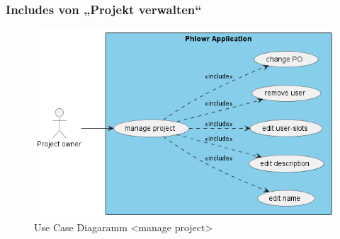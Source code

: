 \subsubsection{Includes von „Projekt verwalten“}
  \begin{figure}[H]
    \begin{center}
      \includegraphics[width=1\linewidth]{../content/diagrams/usecase/manageProject/manageProjectUseCase.png}
      \caption{Use Case Diagaramm <manage project>}
    \end{center}
  \end{figure}

  \newpage

  
  \newpage
  
   
  \newpage

   
   \newpage


  
   
   \newpage


  
  \newpage



  \newpage
